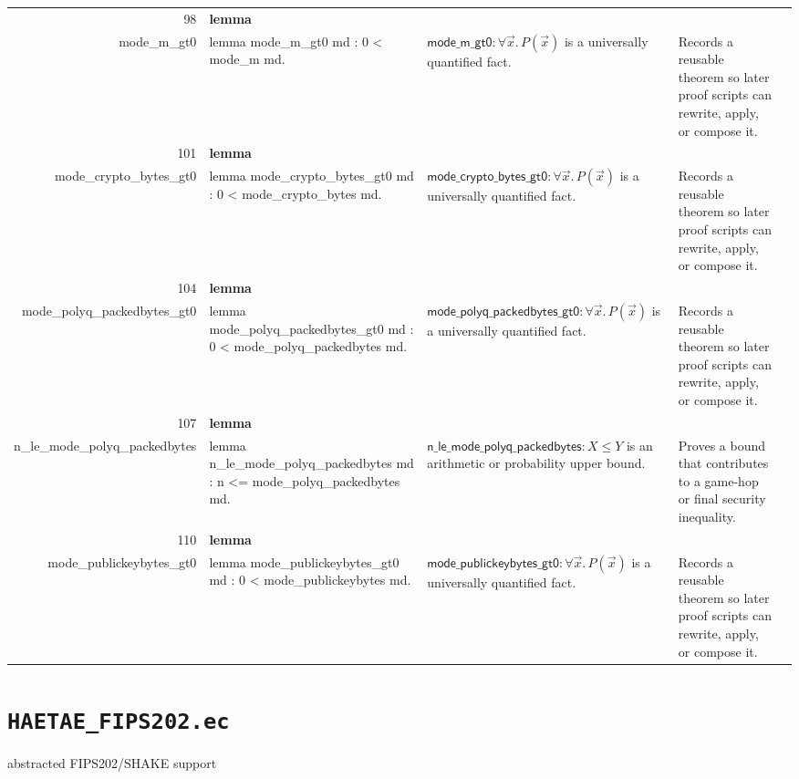 \documentclass[10pt]{article}
\newcommand{\ec}[1]{\begingroup\ttfamily\scriptsize #1\endgroup}
\begin{document}
\begin{longtable}{r L{0.17\textwidth} L{0.26\textwidth} L{0.27\textwidth} L{0.20\textwidth}}
98 & \textbf{lemma}\\\ec{mode\_m\_gt0} & \ec{lemma mode\_m\_gt0 md : 0 < mode\_m md.} & \(\mathsf{mode\_m\_gt0} : \forall \vec{x}.\, P(\vec{x})\) is a universally quantified fact. & Records a reusable theorem so later proof scripts can rewrite, apply, or compose it. \\
101 & \textbf{lemma}\\\ec{mode\_crypto\_bytes\_gt0} & \ec{lemma mode\_crypto\_bytes\_gt0 md : 0 < mode\_crypto\_bytes md.} & \(\mathsf{mode\_crypto\_bytes\_gt0} : \forall \vec{x}.\, P(\vec{x})\) is a universally quantified fact. & Records a reusable theorem so later proof scripts can rewrite, apply, or compose it. \\
104 & \textbf{lemma}\\\ec{mode\_polyq\_packedbytes\_gt0} & \ec{lemma mode\_polyq\_packedbytes\_gt0 md : 0 < mode\_polyq\_packedbytes md.} & \(\mathsf{mode\_polyq\_packedbytes\_gt0} : \forall \vec{x}.\, P(\vec{x})\) is a universally quantified fact. & Records a reusable theorem so later proof scripts can rewrite, apply, or compose it. \\
107 & \textbf{lemma}\\\ec{n\_le\_mode\_polyq\_packedbytes} & \ec{lemma n\_le\_mode\_polyq\_packedbytes md : n <= mode\_polyq\_packedbytes md.} & \(\mathsf{n\_le\_mode\_polyq\_packedbytes} : X \le Y\) is an arithmetic or probability upper bound. & Proves a bound that contributes to a game-hop or final security inequality. \\
110 & \textbf{lemma}\\\ec{mode\_publickeybytes\_gt0} & \ec{lemma mode\_publickeybytes\_gt0 md : 0 < mode\_publickeybytes md.} & \(\mathsf{mode\_publickeybytes\_gt0} : \forall \vec{x}.\, P(\vec{x})\) is a universally quantified fact. & Records a reusable theorem so later proof scripts can rewrite, apply, or compose it. \\
\bottomrule
\end{longtable}

\clearpage
\section{\texorpdfstring{\texttt{HAETAE\_FIPS202.ec}}{HAETAE FIPS202.ec}}
abstracted FIPS202/SHAKE support
\end{document}
